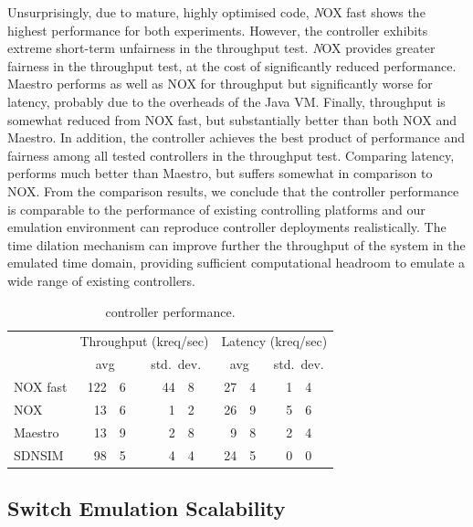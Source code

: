 Unsurprisingly, due to mature, highly optimised code, {\emph NOX fast} shows
the highest performance for both experiments. However, the controller exhibits
extreme short-term unfairness in the throughput test.  {\emph NOX} provides
greater fairness in the throughput test, at the cost of significantly reduced
performance. Maestro performs as well as NOX for throughput but significantly
worse for latency, probably due to the overheads of the Java VM\@.  Finally,
\mirage throughput is somewhat reduced from NOX fast, but substantially better
than both NOX and Maestro. In addition, the \mirage controller achieves the
best product of performance and fairness among all tested controllers in the
throughput test.  Comparing latency, \mirage performs much better than Maestro,
but suffers somewhat in comparison to NOX\@. From the comparison results, we
conclude that the \mirage controller performance is comparable to the
performance of existing controlling platforms and our emulation environment can
reproduce controller deployments realistically. The \sdnsim time dilation
mechanism can improve further the throughput of the system in the emulated time
domain, providing sufficient computational headroom to emulate a wide range of
existing controllers.

\begin{table}
\newcommand\T{\rule{0pt}{2.6ex}}
\newcommand\B{\rule[-1.2ex]{0pt}{0pt}}
\centering
\begin{tabular} {l |r@{.}l r@{.}l|r@{.}l r@{.}l}
\hline
\T \multirow{2}{*}{Controller} 
   & \multicolumn{4}{c|}{Throughput (kreq/sec)}  
   & \multicolumn{4}{c}{Latency (kreq/sec)} \\
\B & \multicolumn{2}{c}{avg} & \multicolumn{2}{c|}{std.\ dev.} 
   & \multicolumn{2}{c}{avg} & \multicolumn{2}{c}{std.\ dev.} \\
\hline
\T NOX fast   & 122&6 & \quad{} 44&8 & 27&4 & \quad{} 1&4 \\
NOX           &  13&6 &  1&2 & 26&9 & 5&6 \\
Maestro       &  13&9 &  2&8 &  9&8 & 2&4 \\
\B SDNSIM     &  98&5 &  4&4 & 24&5 & 0&0 \\
\hline
\end{tabular}
\caption{\label{tbl:controller}\of controller performance.}
\end{table}

\subsection{Switch Emulation Scalability} \label{sec:of-switch-perf}


